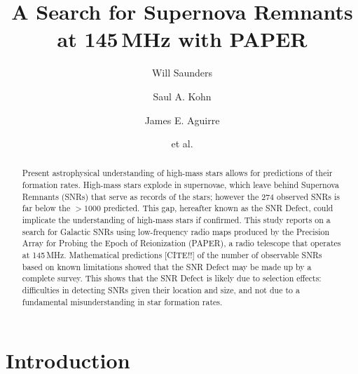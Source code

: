 \documentclass[12pt,preprint]{emulateapj}
\begin{document}
\title{A Search for Supernova Remnants at 145\,MHz with PAPER}

\author{Will Saunders}
\author{Saul A. Kohn}
\author{James E. Aguirre}
\author{et al.}



\begin{abstract}
Present astrophysical understanding of high-mass stars allows for predictions of their formation rates.  High-mass stars explode in supernovae, which leave behind Supernova Remnants (SNRs) that serve as records of the stars; however the 274 observed SNRs is far below the $>1000$ predicted.  This gap, hereafter known as the SNR Defect, could implicate the understanding of high-mass stars if confirmed. This study reports on a search for Galactic SNRs using low-frequency radio maps produced by the Precision Array for Probing the Epoch of Reionization (PAPER), a radio telescope that operates at 145\,MHz.  
Mathematical predictions {\color{red}[CITE!!]} of the number of observable SNRs based on known limitations showed that the SNR Defect may be made up by a complete survey.  This shows that the SNR Defect is likely due to selection effects: difficulties in detecting SNRs given their location and size, and not due to a fundamental misunderstanding in star formation rates.
\end{abstract}

\section{Introduction}
\end{document}
